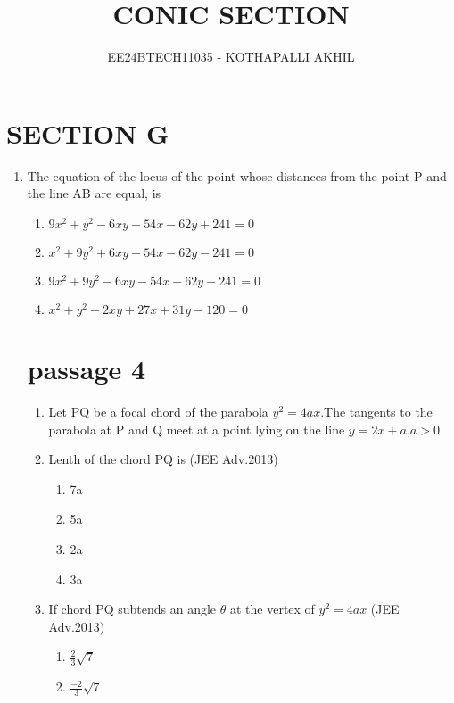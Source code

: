 \documentclass[journal,12pt,twocolumn]{IEEEtran}
\theoremstyle{remark}
\begin{document}

\vspace{3cm}

\title{CONIC SECTION}
\author{EE24BTECH11035 - KOTHAPALLI AKHIL}
\maketitle
\newpage
\bigskip

\renewcommand{\thefigure}{\theenumi}
\renewcommand{\thetable}{\theenumi}
\section{SECTION G}
\begin{enumerate}
\item The equation of the locus of the point whose distances from the point P and the line AB are equal, is

\begin{enumerate}
     \item $9x^2+y^2-6xy-54x-62y+241=0$
     \item $x^2+9y^2+6xy-54x-62y-241=0$
     \item $9x^2+9y^2-6xy-54x-62y-241=0$
     \item $x^2+y^2-2xy+27x+31y-120=0$
\end{enumerate}
\section[]{passage 4}
\begin{enumerate}
\item[]Let PQ be a focal chord of the parabola $y^2=4ax$.The tangents to the parabola at P and Q meet at a point lying on the line $y=2x+a$,$a>0$
\item Lenth of the chord PQ is
\hfill(JEE Adv.2013)        
\begin{enumerate}
    \item 7a
    \item 5a
    \item 2a
    \item 3a
\end{enumerate}
\item If chord PQ subtends an angle $\theta$  at the vertex of $y^2=4ax$
\hfill(JEE Adv.2013)
\begin{enumerate}
    \item $\frac{2}{3}\sqrt{7}$
    
    \item $\frac{-2}{3}\sqrt{7}$
    

\end{enumerate}
\end{enumerate}
\end{enumerate}
\end{document}

